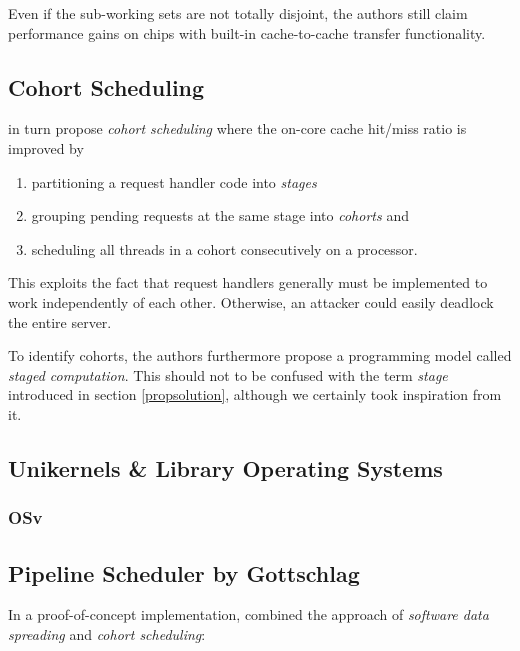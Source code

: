 \documentclass{article}
\begin{document}
Even if the sub-working sets are not totally disjoint, the authors still claim performance gains
on chips with built-in cache-to-cache transfer functionality.

\subsection{Cohort Scheduling}
\citeauthor{cohort} in turn propose \textit{cohort scheduling} where the on-core cache hit/miss ratio is improved by
\begin{enumerate}
\item partitioning a request handler code into \textit{stages}
\item grouping pending requests at the same stage into \textit{cohorts} and
\item scheduling all threads in a cohort consecutively on a processor.
\end{enumerate}

This exploits the fact that request handlers generally must be implemented to work independently of each other.
Otherwise, an attacker could easily deadlock the entire server.

To identify cohorts, the authors furthermore propose a programming model called \textit{staged computation}.
This should not to be confused with the term \textit{stage} introduced in section \ref{propsolution},
although we certainly took inspiration from it.

\subsection{Unikernels \& Library Operating Systems}
\subsubsection{OSv}

\subsection{Pipeline Scheduler by Gottschlag}

In a proof-of-concept implementation, \citeauthor{gottschlag2017} combined the approach of \textit{software data spreading} and \textit{cohort scheduling}:
\end{document}
